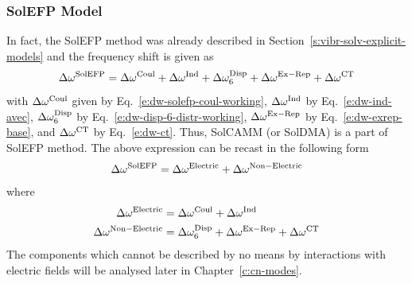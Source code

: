 \documentclass[b5paper,oneside,fleqn,11pt]{book}
\begin{document}
\begin{refsection}
\subsubsection{SolEFP Model\label{s:solefp-working-model}}

In fact, the SolEFP method was already described in Section~\ref{s:vibr-solv-explicit-models}
and the frequency shift is given as
%
\begin{equation} \label{e:dw-solefp}
\Delta\omega^{\rm SolEFP} = 
\Delta\omega^{\rm Coul} + \Delta\omega^{\rm Ind} + \Delta\omega^{\rm Disp}_6 +
\Delta\omega^{\rm Ex-Rep} + \Delta\omega^{\rm CT}
\end{equation}
%
with $\Delta\omega^{\rm Coul}$ given by Eq.~\eqref{e:dw-solefp-coul-working},  
$\Delta\omega^{\rm Ind}$ by Eq.~\eqref{e:dw-ind-avec},
$\Delta\omega^{\rm Disp}_6$ by Eq.~\eqref{e:dw-disp-6-distr-working},
$\Delta\omega^{\rm Ex-Rep}$ by Eq.~\eqref{e:dw-exrep-base},
and $\Delta\omega^{\rm CT}$ by Eq.~\eqref{e:dw-ct}.
Thus, SolCAMM (or SolDMA) is a part of SolEFP method.
The above expression can be recast in the following form
%
\begin{equation} \label{e:dw-solefp-electric-nonelectric}
\Delta\omega^{\rm SolEFP} = 
\Delta\omega^{\rm Electric} + \Delta\omega^{\rm Non-Electric}
\end{equation}
%
where
%
\begin{subequations} 
\begin{align}
\Delta\omega^{\rm Electric}       &=  \Delta\omega^{\rm Coul} + \Delta\omega^{\rm Ind} \label{e:dw-solefp-electric} \\ 
 \Delta\omega^{\rm Non-Electric}  &=  \Delta\omega^{\rm Disp}_6 +
\Delta\omega^{\rm Ex-Rep} + \Delta\omega^{\rm CT} \label{e:dw-solefp-nonelectric}
\end{align}
\end{subequations}
%
The components which cannot be described by no means by interactions
with electric fields  will be analysed later in Chapter~\ref{c:cn-modes}.


\end{refsection}
\end{document}

